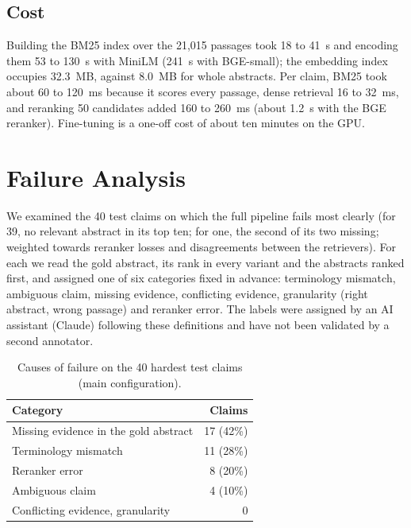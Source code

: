 \documentclass[runningheads]{llncs}
\begin{document}
\subsection{Cost}
Building the BM25 index over the 21{,}015 passages took 18 to 41~s and encoding
them 53 to 130~s with MiniLM (241~s with BGE-small); the embedding index occupies
32.3~MB, against 8.0~MB for whole abstracts. Per claim, BM25 took about 60 to
120~ms because it scores every passage, dense retrieval 16 to 32~ms, and reranking
50 candidates added 160 to 260~ms (about 1.2~s with the BGE reranker).
Fine-tuning is a one-off cost of about ten minutes on the GPU.

\section{Failure Analysis}
\label{sec:failures}

We examined the 40 test claims on which the full pipeline fails most clearly
(for 39, no relevant abstract in its top ten; for one, the second of its two
missing; weighted towards reranker losses and disagreements between the
retrievers). For each we read the gold abstract, its
rank in every variant and the abstracts ranked first, and assigned one of six
categories fixed in advance: terminology mismatch, ambiguous claim, missing
evidence, conflicting evidence, granularity (right abstract, wrong passage) and
reranker error. The labels were assigned by
an AI assistant (Claude) following these definitions and have not been
validated by a second annotator.

\begin{table}[t]
\centering\footnotesize
\caption{Causes of failure on the 40 hardest test claims (main configuration).}
\label{tab:failures}
\begin{tabular}{@{}lr@{}}
\toprule
Category & Claims \\
\midrule
Missing evidence in the gold abstract & 17 (42\%) \\
Terminology mismatch                  & 11 (28\%) \\
Reranker error                        &  8 (20\%) \\
Ambiguous claim                       &  4 (10\%) \\
Conflicting evidence, granularity     &  0 \\
\bottomrule
\end{tabular}
\end{table}
\end{document}
